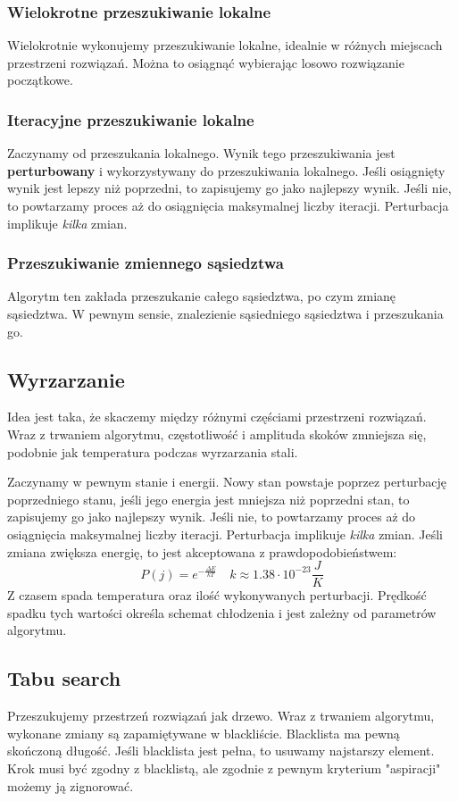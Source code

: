 \documentclass{../notatki}
\begin{document}
\subsubsection{Wielokrotne przeszukiwanie lokalne}

Wielokrotnie wykonujemy przeszukiwanie lokalne, idealnie w różnych miejscach
przestrzeni rozwiązań. Można to osiągnąć wybierając losowo
rozwiązanie początkowe.

\subsubsection{Iteracyjne przeszukiwanie lokalne}

Zaczynamy od przeszukania lokalnego. Wynik tego przeszukiwania jest
\textbf{perturbowany} i wykorzystywany do przeszukiwania lokalnego. Jeśli
osiągnięty wynik jest lepszy niż poprzedni, to zapisujemy go jako najlepszy
wynik. Jeśli nie, to powtarzamy proces aż do osiągnięcia maksymalnej liczby
iteracji. Perturbacja implikuje \textit{kilka} zmian.

\subsubsection{Przeszukiwanie zmiennego sąsiedztwa}

Algorytm ten zakłada przeszukanie całego sąsiedztwa, po czym zmianę sąsiedztwa.
W pewnym sensie, znalezienie sąsiedniego sąsiedztwa i przeszukania go.

\subsection{Wyrzarzanie}

Idea jest taka, że skaczemy między różnymi częściami przestrzeni rozwiązań.
Wraz z trwaniem algorytmu, częstotliwość i amplituda skoków zmniejsza się,
podobnie jak temperatura podczas wyrzarzania stali.

Zaczynamy w pewnym stanie i energii. Nowy stan powstaje poprzez perturbację
poprzedniego stanu, jeśli jego energia jest mniejsza niż poprzedni stan, to
zapisujemy go jako najlepszy wynik. Jeśli nie, to powtarzamy proces
aż do osiągnięcia maksymalnej liczby
iteracji. Perturbacja implikuje \textit{kilka} zmian. Jeśli zmiana zwiększa
energię, to jest akceptowana z prawdopodobieństwem:
$$
P(j) = e^{-\frac{\Delta E}{kT}} \quad k \approx 1.38 \cdot 10^{-23} \frac{J}{K}
$$
Z czasem spada temperatura oraz ilość wykonywanych perturbacji. Prędkość
spadku tych wartości określa schemat chłodzenia i jest zależny od
parametrów algorytmu.

\subsection{Tabu search}

Przeszukujemy przestrzeń rozwiązań jak drzewo. Wraz z trwaniem algorytmu,
wykonane zmiany są zapamiętywane w blackliście. Blacklista ma pewną skończoną
długość. Jeśli blacklista jest pełna, to usuwamy najstarszy element.
Krok musi być zgodny z blacklistą, ale zgodnie z pewnym kryterium "aspiracji"
możemy ją zignorować.
\end{document}
